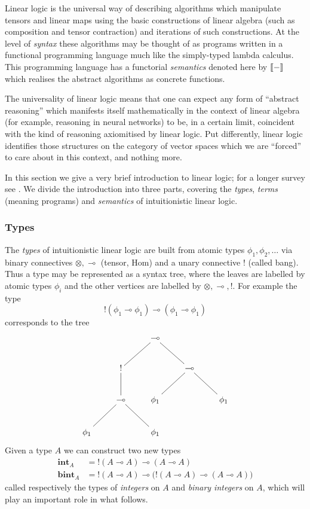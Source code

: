 \documentclass[english,letter paper,12pt,leqno]{article}
\theoremstyle{example}
\numberwithin{equation}{section}
\begin{document}
Linear logic is the universal way of describing algorithms which manipulate tensors and linear maps using the basic constructions of linear algebra (such as composition and tensor contraction) and iterations of such constructions. At the level of \emph{syntax} these algorithms may be thought of as programs written in a functional programming language much like the simply-typed lambda calculus. This programming language has a functorial \emph{semantics} denoted here by $\llbracket - \rrbracket$ which realises the abstract algorithms as concrete functions.

The universality of linear logic means that one can expect any form of ``abstract reasoning'' which manifests itself mathematically in the context of linear algebra (for example, reasoning in neural networks) to be, in a certain limit, coincident with the kind of reasoning axiomitised by linear logic. Put differently, linear logic identifies those structures on the category of vector spaces which we are ``forced'' to care about in this context, and nothing more.

In this section we give a very brief introduction to linear logic; for a longer survey see \cite{murfet_ll,murfetclift}. We divide the introduction into three parts, covering the \emph{types}, \emph{terms} (meaning programs) and \emph{semantics} of intuitionistic linear logic.

\subsubsection{Types}

The \emph{types} of intuitionistic linear logic are built from atomic types $\phi_1,\phi_2,\ldots$ via binary connectives $\otimes, \multimap$ (tensor, Hom) and a unary connective ${!}$ (called bang). Thus a type may be represented as a syntax tree, where the leaves are labelled by atomic types $\phi_i$ and the other vertices are labelled by $\otimes, \multimap, {!}$. For example the type
\[
{!}(\phi_1 \multimap \phi_1) \multimap (\phi_1 \multimap \phi_1)
\]
corresponds to the tree
\[
\xymatrix{
& & \multimap\\
& {!}\ar@{-}[ur] & & \multimap\ar@{-}[ul]\\
& \multimap\ar@{-}[u] & \phi_1\ar@{-}[ur] & & \phi_1\ar@{-}[ul]\\
\phi_1 \ar@{-}[ur] & & \phi_1 \ar@{-}[ul]
}
\]
Given a type $A$ we can construct two new types
\begin{align*}
\textbf{int}_A &= {!}(A \multimap A) \multimap (A \multimap A)\\
\textbf{bint}_A &= {!}(A \multimap A) \multimap \big({!}(A \multimap A) \multimap (A \multimap A)\big)
\end{align*}
called respectively the types of \emph{integers} on $A$ and \emph{binary integers} on $A$, which will play an important role in what follows.
\end{document}
